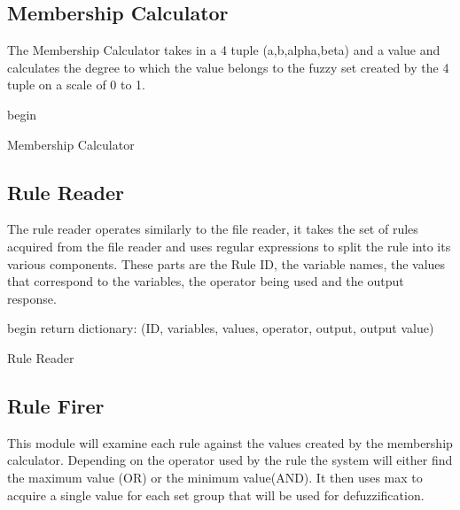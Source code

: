 \documentclass{article}
\begin{document}
\subsection{Membership Calculator}
The Membership Calculator takes in a 4 tuple (a,b,alpha,beta) and a value and calculates the degree to which the value belongs to the fuzzy set created by the 4 tuple on a scale of 0 to 1. 

\begin{algorithm}[H]
\SetAlgoLined
{}
 begin\;
 \caption{Membership Calculator}
\end{algorithm}

\subsection{Rule Reader}
The rule reader operates similarly to the file reader, it takes the set of rules acquired from the file reader and uses regular expressions to split the rule into its various components. These parts are the Rule ID, the variable names, the values that correspond to the variables, the operator being used and the output response.

\begin{algorithm}[H]
\SetAlgoLined
{}
 begin\;
 return dictionary: (ID, variables, values, operator, output, output value)
 \caption{Rule Reader}
\end{algorithm}

\subsection{Rule Firer}
This module will examine each rule against the values created by the membership calculator. Depending on the operator used by the rule the system will either find the maximum value (OR) or the minimum value(AND). It then uses max to acquire a single value for each set group that will be used for defuzzification. 
\end{document}
